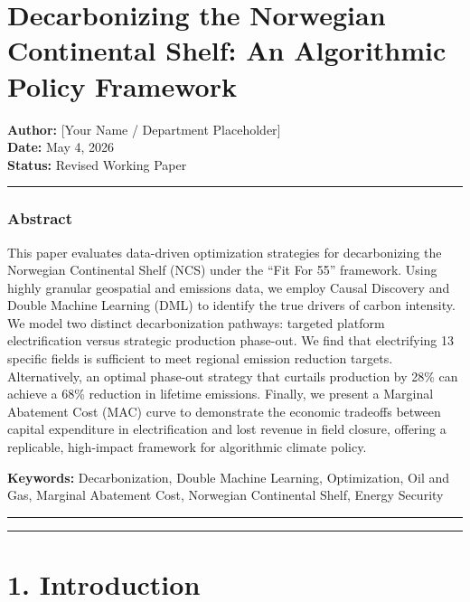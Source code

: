 \documentclass[
  11pt,
]{article}
\author{}
\date{}
\begin{document}
\section{Decarbonizing the Norwegian Continental Shelf: An Algorithmic
Policy
Framework}\label{decarbonizing-the-norwegian-continental-shelf-an-algorithmic-policy-framework}

\textbf{Author:} {[}Your Name / Department Placeholder{]}\\
\textbf{Date:} May 4, 2026\\
\textbf{Status:} Revised Working Paper

\begin{center}\rule{0.5\linewidth}{0.5pt}\end{center}

\subsubsection{Abstract}\label{abstract}

This paper evaluates data-driven optimization strategies for
decarbonizing the Norwegian Continental Shelf (NCS) under the ``Fit For
55'' framework. Using highly granular geospatial and emissions data, we
employ Causal Discovery and Double Machine Learning (DML) to identify
the true drivers of carbon intensity. We model two distinct
decarbonization pathways: targeted platform electrification versus
strategic production phase-out. We find that electrifying 13 specific
fields is sufficient to meet regional emission reduction targets.
Alternatively, an optimal phase-out strategy that curtails production by
28\% can achieve a 68\% reduction in lifetime emissions. Finally, we
present a Marginal Abatement Cost (MAC) curve to demonstrate the
economic tradeoffs between capital expenditure in electrification and
lost revenue in field closure, offering a replicable, high-impact
framework for algorithmic climate policy.

\textbf{Keywords:} Decarbonization, Double Machine Learning,
Optimization, Oil and Gas, Marginal Abatement Cost, Norwegian
Continental Shelf, Energy Security

\begin{center}\rule{0.5\linewidth}{0.5pt}\end{center}

\begin{center}\rule{0.5\linewidth}{0.5pt}\end{center}

\section{1. Introduction}\label{introduction}
\end{document}
